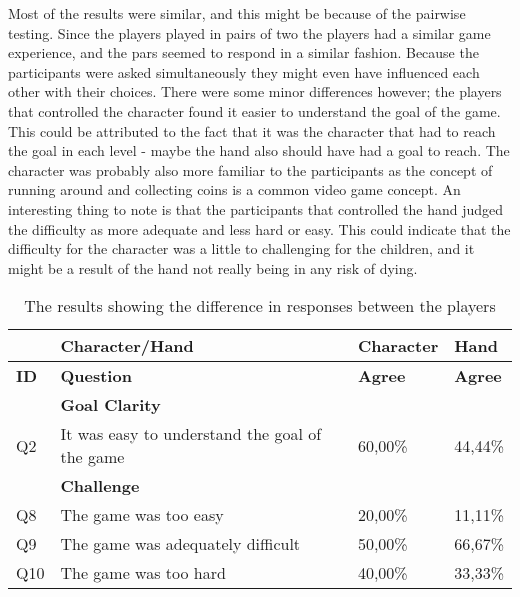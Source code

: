 Most of the results were similar, and this might be because of the pairwise testing. Since the players played in pairs of two the players had a similar game experience, and the pars seemed to respond in a similar fashion. Because the participants were asked simultaneously they might even have influenced each other with their choices. There were some minor differences however; the players that controlled the character found it easier to understand the goal of the game. This could be attributed to the fact that it was the character that had to reach the goal in each level - maybe the hand also should have had a goal to reach. The character was probably also more familiar to the participants as the concept of running around and collecting coins is a common video game concept. An interesting thing to note is that the participants that controlled the hand  judged the difficulty as more adequate and less hard or easy. This could indicate that the difficulty for the character was a little to challenging for the children, and it might be a result of the hand not really being in any risk of dying.
\begin{table}[ht]
	\centering
	\caption{The results showing the difference in responses between the players}
	\label{tab:control_diff}
	\begin{tabularx}{\textwidth}{|l|X|l|l|}
		\hline
		& \textbf{Character/Hand}                        & \textbf{Character} & \textbf{Hand}  \\ \hline
		\textbf{ID} & \textbf{Question}                              & \textbf{Agree}     & \textbf{Agree} \\ \hline
		& \textbf{Goal Clarity}                          &                    &                \\ \hline
		Q2          & It was easy to understand the goal of the game & 60,00\%            & 44,44\%        \\ \hline
		& \textbf{Challenge}                             &                    &                \\ \hline
		Q8          & The game was too easy                          & 20,00\%            & 11,11\%        \\ \hline
		Q9          & The game was adequately difficult              & 50,00\%            & 66,67\%        \\ \hline
		Q10         & The game was too hard                          & 40,00\%            & 33,33\%        \\ \hline
	\end{tabularx}
\end{table}

